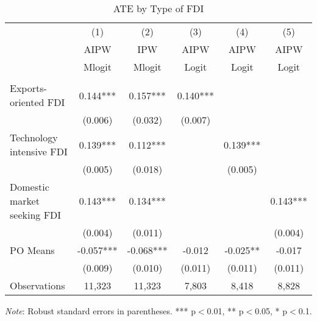 \begin{table}[htbp]
	\centering
	\caption{ATE by Type of FDI}
	\label{tab:bytype}
\begin{threeparttable}

\begin{tabular}{lccccc} 
		\hline
		\hline
 	& (1) & (2) & (3) & (4) & (5) \\
	& AIPW & IPW  & AIPW  & AIPW & AIPW \\ 
	& Mlogit & Mlogit &Logit &Logit &Logit\\
		\hline
 			&  &  &  &  &   \\
Exports-oriented FDI & 0.144*** &   0.157*** &  0.140*** &  &   \\
 & (0.006) &   (0.032) &  (0.007) &  &   \\
Technology intensive FDI & 0.139*** &   0.112*** &  & 0.139*** &    \\
 & (0.005) &   (0.018) &  &  (0.005)&    \\
Domestic market seeking FDI& 0.143*** &   0.134*** &  &  & 0.143*** \\
 & (0.004) &   (0.011) &  &  & (0.004)  \\
PO Means &   -0.057*** &   -0.068*** & -0.012 &   -0.025** &   -0.017   \\
 &   (0.009) &   (0.010) &  (0.011) &   (0.011) &   (0.011) \\

Observations 	& 11,323  & 11,323 &  7,803  & 8,418 & 8,828  \\ 
		\hline
		\hline
\end{tabular}

\begin{tablenotes}[flushleft]
	\footnotesize
\item \textit{Note}: Robust standard errors in parentheses. *** p$<$0.01, ** p$<$0.05, * p$<$0.1.
\end{tablenotes}

\end{threeparttable}
\end{table}